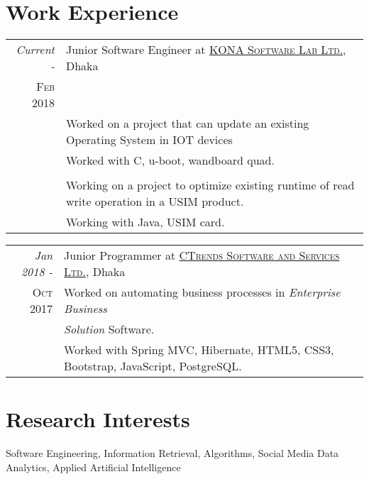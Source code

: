 \documentclass[a4paper,10pt]{article}
\begin{document}
\section{Work Experience}
\begin{tabular}{r|p{11cm}}
 \emph{Current -} & Junior Software Engineer at \href{http://www.konai.com}{\textsc{KONA Software Lab Ltd.}}, Dhaka \\
 \textsc{Feb 2018} & \\
 & Worked on a project that can update an existing Operating System in IOT devices \\ 
 & Worked with C, u-boot, wandboard quad. \\
& \\
& Working on a project to optimize existing runtime of read write \mbox{operation} in a USIM product. \\
& Working with Java, USIM card.

\end{tabular}


\begin{tabular}{r|p{11cm}}
 \emph{Jan 2018 -} & Junior Programmer at \href{http://www.ctrends-software.com}{\textsc{CTrends Software and Services Ltd.}}, Dhaka \\\textsc{Oct 2017} & Worked on automating business processes in \emph{Enterprise Business} \\ & \emph{Solution} Software.\\
 & Worked with Spring MVC, Hibernate, HTML5, CSS3, Bootstrap, JavaScript, PostgreSQL.
\end{tabular}

\section{Research Interests}
Software Engineering, Information Retrieval, Algorithms, Social Media Data Analytics, \newline Applied Artificial Intelligence

\end{document}
